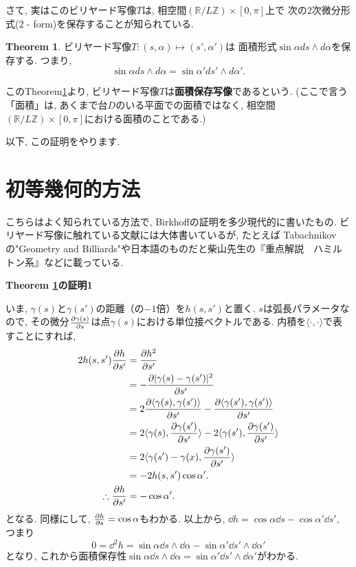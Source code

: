 \documentclass[a4paper]{ujarticle}
\makeatletter
\numberwithin{equation}{section}
\theoremstyle{definition}
\newtheorem{theorem}{Theorem}
\renewenvironment{proof}[1][Proof]{\par
  \pushQED{\qed}%
  \normalfont \topsep6\p@\@plus6\p@\relax
  \trivlist
  \item\relax
  {\bfseries
  #1\@addpunct{.}}\hspace\labelsep\ignorespaces
}{%
  \popQED\endtrivlist\@endpefalse
}
\makeatother
\begin{document}
    さて, 実はこのビリヤード写像$T$は, 相空間$(\mathbb{R}/L \mathbb{Z}) \times [0, \pi]$上で
    次の$2$次微分形式($2$ - form)を保存することが知られている.

    \begin{theorem} \label{th:area}
        ビリヤード写像$T: (s, \alpha) \mapsto (s', \alpha')$は
        面積形式$\sin{\alpha} d s \wedge d \alpha$を保存する. 
        つまり, 
        \[
            \sin{\alpha} d s \wedge d \alpha = \sin{\alpha'} d s' \wedge d \alpha'.
        \]
    \end{theorem}

    このTheorem\ref{th:area}より, ビリヤード写像$T$は\textbf{面積保存写像}であるという.
    (ここで言う「面積」は, あくまで台$D$のいる平面での面積ではなく,
    相空間$(\mathbb{R}/L \mathbb{Z}) \times [0, \pi]$における面積のことである.)

    以下, この証明をやります.
\section{初等幾何的方法}
    こちらはよく知られている方法で, Birkhoffの証明を多少現代的に書いたもの.
    ビリヤード写像に触れている文献には大体書いているが,
    たとえば Tabachnikovの"Geometry and Billiards"や日本語のものだと柴山先生の『重点解説　ハミルトン系』などに載っている.

    \begin{proof}[Theorem \ref{th:area}の証明1]
        いま, $\gamma(s)$と$\gamma(s')$の距離（の$-1$倍）を$h(s, s')$と置く.
        $s$は弧長パラメータなので, 
        その微分$\pdv{\gamma(s)}{s}$は点$\gamma(s)$における単位接ベクトルである.
        内積を$\langle \cdot, \cdot \rangle$で表すことにすれば,
		\begin{align*}
			2 h(s, s') \pdv{h}{s'} &= \pdv{h^2}{s'}\\
            &= - \pdv{|\gamma(s) - \gamma(s')|^2}{s'}\\
            &= 2 \pdv{\langle \gamma(s) , \gamma(s') \rangle}{s'} - \pdv{\langle \gamma(s') , \gamma(s') \rangle}{s'} \\
			&= 2 \langle \gamma(s) , \pdv{\gamma(s')}{s'} \rangle - 2 \langle \gamma(s') , \pdv{\gamma(s')}{s'} \rangle \\
            &= 2\langle \gamma(s') - \gamma(x) , \pdv{\gamma(s')}{s'} \rangle \\
			&= - 2h(s, s') \cos \alpha'. \\
            \therefore \pdv{h}{s'} &= - \cos \alpha'.
        \end{align*}
        となる.
		同様にして, $\pdv{h}{s} = \cos \alpha$もわかる. 
        以上から, $\dd h = \cos \alpha \dd s - \cos \alpha' \dd s'$, 
        つまり 
        \[
            0 = \dd^2 h = \sin \alpha \dd s \land \dd \alpha - \sin \alpha' \dd s' \land \dd \alpha'
        \]
        となり,
        これから面積保存性$\sin \alpha \dd s \land \dd \alpha = \sin \alpha' \dd s' \land \dd \alpha'$がわかる.
    \end{proof}
\end{document}
